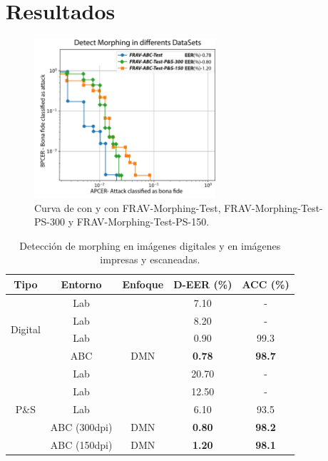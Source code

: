 \section{Resultados} \label{sec:morphingResultados}

\begin{figure}[t!]
    \centering
    \includegraphics[width=0.6\textwidth]{ch-sistemasABC/images/ch-morphing/DEMORPHING_TEXT_PS300_PS150_CON_FORMAS.png}
    \caption{Curva de  con  y  con \Gls{FRAV-Morphing-Test}, \Gls{FRAV-Morphing-Test-PS-300} y \Gls{FRAV-Morphing-Test-PS-150}.}
    \label{fig:Morphingde-morphing}
\end{figure}

\begin{table}[t!]
\centering
\caption{Detección de \gls{morphing} en imágenes digitales y en imágenes impresas y escaneadas.}
\begin{tabular}{|c|c|c|c|c|}
\hline
\textbf{Tipo} & \textbf{Entorno} & \textbf{Enfoque} & \textbf{D-EER (\%)} & \textbf{ACC (\%)} \\ \hline
\multirow{4}{*}{Digital} & Lab & \cite{scherhag2017vulnerability} & 7.10 & - \\ \cline{2-5} 
 & Lab & \cite{raghavendra2017transferable} & 8.20 & - \\ \cline{2-5} 
 & Lab &  \cite{ferrara2019face} & 0.90 & 99.3 \\ \cline{2-5} 
 & ABC & DMN & \textbf{0.78} & \textbf{98.7} \\ \hline
\multirow{5}{*}{P\&S} & Lab & \cite{scherhag2017vulnerability} & 20.70 & - \\ \cline{2-5} 
 & Lab & \cite{raghavendra2017transferable} & 12.50 & - \\ \cline{2-5} 
 & Lab & \cite{ferrara2019face} & 6.10 & 93.5 \\ \cline{2-5} 
 & ABC (300dpi) & DMN & \textbf{0.80} & \textbf{98.2} \\ \cline{2-5} 
 & ABC (150dpi) & DMN & \textbf{1.20} & \textbf{98.1} \\ \hline
\end{tabular}\label{tab:comparative}
\end{table}


